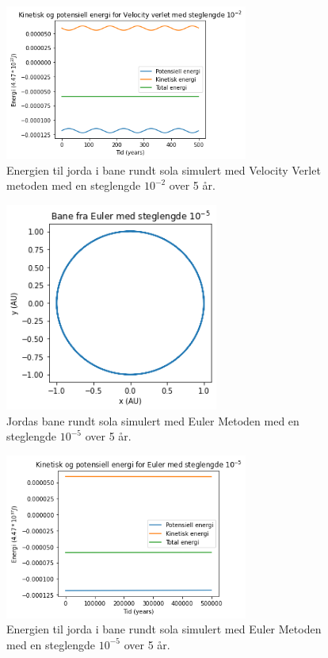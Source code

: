 \documentclass[reprint,english,notitlepage]{revtex4-1}
\begin{document}
	\begin{figure}[H]
		\includegraphics[width=80mm]{../../Code/Figures/vverleten2.png}
		\caption{Energien til jorda i bane rundt sola simulert med Velocity Verlet metoden med en steglengde $10^{-2}$ over 5 år.}
		\label{fig:vverleten2}
	\end{figure}

	\begin{figure}[H]
		\includegraphics[width=70mm]{../../Code/Figures/euler5.png}
		\caption{Jordas bane rundt sola simulert med Euler Metoden med en steglengde $10^{-5}$ over 5 år.}
		\label{fig:euler5}
	\end{figure}
	
	\begin{figure}[H]
		\includegraphics[width=80mm]{../../Code/Figures/euleren5.png}
		\caption{Energien til jorda i bane rundt sola simulert med Euler Metoden med en steglengde $10^{-5}$ over 5 år.}
		\label{fig:euleren5}
	\end{figure}
\end{document}
